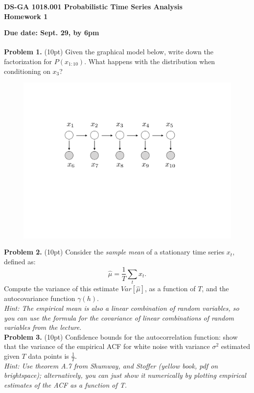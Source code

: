\documentclass[12pt]{article}
\begin{document}
\thispagestyle{empty}
\begin{center}

\textbf{DS-GA 1018.001 Probabilistic Time Series Analysis\\
Homework 1}
\end{center}

\noindent \textbf{Due date: Sept. 29, by 6pm}\\
\\
\noindent \textbf{Problem 1. } (10pt) Given the graphical model below, write down the factorization for $P(x_{1:10})$. What happens with the distribution when conditioning on $x_3$?
\begin{figure}[h!]
\centering
\vspace{-1mm}
\includegraphics[width=4.5in]{gmhw1.pdf}
\end{figure}


\noindent \textbf{Problem 2. }  (10pt) Consider the \emph{sample mean} of a stationary time series  $x_t$, defined as:
\begin{equation}
\hat{\mu} = \frac{1}{T} \sum_t x_t.
\end{equation}
Compute the variance of this estimate $Var[\hat{\mu}]$, as a function of $T$, and the autocovariance function $\gamma(h)$.\\
\emph{Hint: The empirical mean is also a linear combination of random variables, so you can use the formula for the covariance of linear combinations of random variables from the lecture. }\\

\noindent \textbf{Problem 3. } (10pt) Confidence bounds for the autocorrelation function: 
show that the variance of the empirical ACF for white noise with variance $\sigma^2$ estimated given $T$ data points is $\frac{1}{T}$.\\
\emph{Hint: Use theorem A.7 from Shumway, and  Stoffer  (yellow book, pdf on brightspace); alternatively, you can just show it numerically by plotting empirical estimates of the ACF as a function of T. }\\
\end{document}
